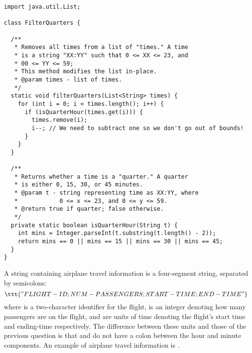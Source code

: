 \begin{lstlisting}[language=MyJava]
import java.util.List;

class FilterQuarters {

  /**
   * Removes all times from a list of "times." A time
   * is a string "XX:YY" such that 0 <= XX <= 23, and 
   * 00 <= YY <= 59; 
   * This method modifies the list in-place.
   * @param times - list of times.
   */
  static void filterQuarters(List<String> times) {
    for (int i = 0; i < times.length(); i++) {
      if (isQuarterHour(times.get(i))) {
        times.remove(i);
        i--; // We need to subtract one so we don't go out of bounds!
      }
    }
  }

  /**
   * Returns whether a time is a "quarter." A quarter
   * is either 0, 15, 30, or 45 minutes.
   * @param t - string representing time as XX:YY, where
   *            0 <= x <= 23, and 0 <= y <= 59.
   * @return true if quarter; false otherwise.
   */
  private static boolean isQuarterHour(String t) {
    int mins = Integer.parseInt(t.substring(t.length() - 2));
    return mins == 0 || mins == 15 || mins == 30 || mins == 45;
  }
}
\end{lstlisting}

A string containing airplane travel information is a four-segment string, separated by semicolons: 
\[
\ttt{"FLIGHT-ID;NUM-PASSENGERS;START-TIME;END-TIME"} 
\]
where  is a two-character identifier for the flight,  is an integer denoting how many passengers are on the flight,  and  are units of time denoting the flight's start time and ending-time respectively.
The difference between these units and those of the previous question is that  and  do not have a colon between the hour and minute components.
An example of airplane travel information is . 

